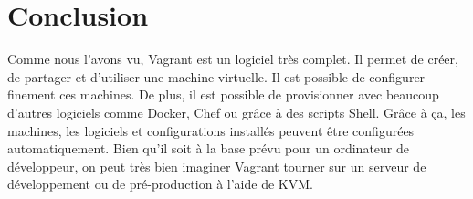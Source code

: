 \documentclass[12pt,a4paper]{article}
\begin{document}
\section{Conclusion}

Comme nous l'avons vu, Vagrant est un logiciel très complet. Il permet de créer, de partager et d'utiliser une machine virtuelle. Il est possible de configurer finement ces machines. De plus, il est possible de provisionner avec beaucoup d'autres logiciels comme Docker, Chef ou grâce à des scripts Shell. Grâce à ça, les machines, les logiciels et configurations installés peuvent être configurées automatiquement. Bien qu'il soit à la base prévu pour un ordinateur de développeur, on peut très bien imaginer Vagrant tourner sur un serveur de développement ou de pré-production à l'aide de KVM. 
\end{document}
